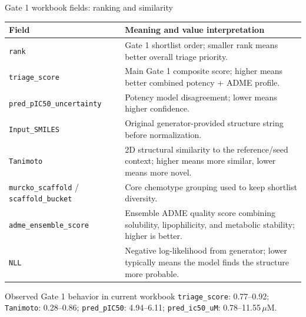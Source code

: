 \documentclass[aspectratio=169,10pt]{beamer}
\begin{document}
\begin{frame}{Gate 1 workbook fields: ranking and similarity}
  \scriptsize
  \begin{tabularx}{\textwidth}{lX}
    \toprule
    \textbf{Field} & \textbf{Meaning and value interpretation} \\
    \midrule
    \texttt{rank} & Gate 1 shortlist order; smaller rank means better overall triage priority. \\
    \texttt{triage\_score} & Main Gate 1 composite score; higher means better combined potency + ADME profile. \\
    \texttt{pred\_pIC50\_uncertainty} & Potency model disagreement; lower means higher confidence. \\
    \texttt{Input\_SMILES} & Original generator-provided structure string before normalization. \\
    \texttt{Tanimoto} & 2D structural similarity to the reference/seed context; higher means more similar, lower means more novel. \\
    \texttt{murcko\_scaffold} / \texttt{scaffold\_bucket} & Core chemotype grouping used to keep shortlist diversity. \\
    \texttt{adme\_ensemble\_score} & Ensemble ADME quality score combining solubility, lipophilicity, and metabolic stability; higher is better. \\
    \texttt{NLL} & Negative log-likelihood from generator; lower typically means the model finds the structure more probable. \\
    \bottomrule
  \end{tabularx}

  \vspace{2pt}
  \begin{exampleblock}{Observed Gate 1 behavior in current workbook}
    \texttt{triage\_score}: 0.77--0.92; \texttt{Tanimoto}: 0.28--0.86;
    \texttt{pred\_pIC50}: 4.94--6.11; \texttt{pred\_ic50\_uM}: 0.78--11.55\,\(\mu\)M.
  \end{exampleblock}
\end{frame}
\end{document}
